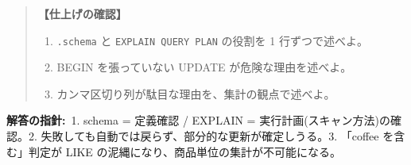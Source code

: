 \documentclass{article}
\begin{document}
\begin{quote}
\textbf{【仕上げの確認】}
\begin{enumerate}
\item \texttt{.schema} と \texttt{EXPLAIN QUERY PLAN} の役割を 1 行ずつで述べよ。
\item BEGIN を張っていない UPDATE が危険な理由を述べよ。
\item カンマ区切り列が駄目な理由を、集計の観点で述べよ。
\end{enumerate}
\end{quote}

\textbf{解答の指針:}\ 1. schema = 定義確認 / EXPLAIN = 実行計画(スキャン方法)の確認。2. 失敗しても自動では戻らず、部分的な更新が確定しうる。3. 「coffee を含む」判定が LIKE の泥縄になり、商品単位の集計が不可能になる。
\end{document}
